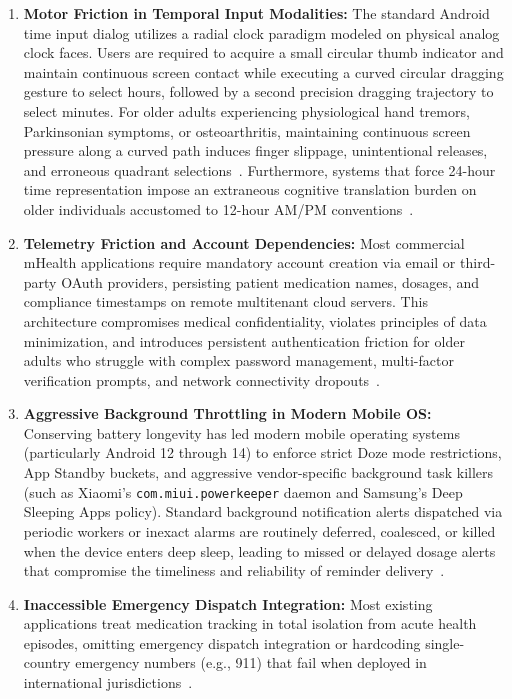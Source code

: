 \documentclass[11pt,a4paper]{article}
\begin{document}
\begin{enumerate}[leftmargin=*]
    \item \textbf{Motor Friction in Temporal Input Modalities:} The standard Android time input dialog utilizes a radial clock paradigm modeled on physical analog clock faces. Users are required to acquire a small circular thumb indicator and maintain continuous screen contact while executing a curved circular dragging gesture to select hours, followed by a second precision dragging trajectory to select minutes. For older adults experiencing physiological hand tremors, Parkinsonian symptoms, or osteoarthritis, maintaining continuous screen pressure along a curved path induces finger slippage, unintentional releases, and erroneous quadrant selections~\cite{trewin2013physical,siek2006fat}. Furthermore, systems that force 24-hour time representation impose an extraneous cognitive translation burden on older individuals accustomed to 12-hour AM/PM conventions~\cite{kurniawan2008older}.

    \item \textbf{Telemetry Friction and Account Dependencies:} Most commercial mHealth applications require mandatory account creation via email or third-party OAuth providers, persisting patient medication names, dosages, and compliance timestamps on remote multitenant cloud servers. This architecture compromises medical confidentiality, violates principles of data minimization, and introduces persistent authentication friction for older adults who struggle with complex password management, multi-factor verification prompts, and network connectivity dropouts~\cite{kleppmann2019local,wildenbos2018aging}.

    \item \textbf{Aggressive Background Throttling in Modern Mobile OS:} Conserving battery longevity has led modern mobile operating systems (particularly Android 12 through 14) to enforce strict Doze mode restrictions, App Standby buckets, and aggressive vendor-specific background task killers (such as Xiaomi's \texttt{com.miui.powerkeeper} daemon and Samsung's Deep Sleeping Apps policy). Standard background notification alerts dispatched via periodic workers or inexact alarms are routinely deferred, coalesced, or killed when the device enters deep sleep, leading to missed or delayed dosage alerts that compromise the timeliness and reliability of reminder delivery~\cite{google2024alarms}.

    \item \textbf{Inaccessible Emergency Dispatch Integration:} Most existing applications treat medication tracking in total isolation from acute health episodes, omitting emergency dispatch integration or hardcoding single-country emergency numbers (e.g., 911) that fail when deployed in international jurisdictions~\cite{etsi2020emergency,itu2008emergency}.
\end{enumerate}
\end{document}
